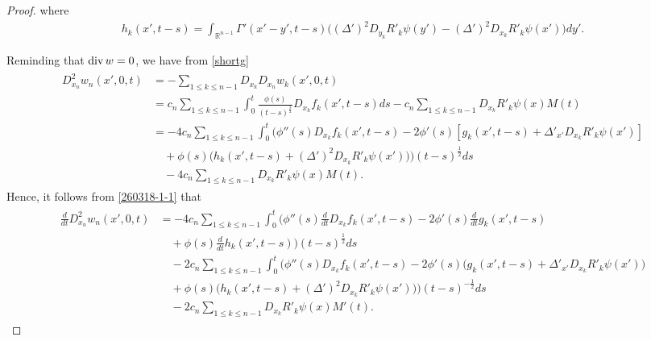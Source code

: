 \documentclass{amsart}
\numberwithin{equation}{section}
\newcommand{\Rn}{{\mathbb R}^{n-1}}
\newcommand{\De}{\Delta}
\newcommand{\Ga}{\Gamma}
\begin{document}
\begin{proof}
where 
\begin{align*}
h_k (x', t-s)  = \int_{\Rn} \Ga' (x'- y', t-s) \Big(  ( \De')^2  D_{y_k} R'_k \psi(y') -  ( \De')^2  D_{x_k}  R'_k \psi(x') \Big) dy'.
\end{align*}





 


 
Reminding that $ {\rm div} \, w =0$, we have  from \eqref{shortg}
\begin{align}\label{260318-1-1}
\begin{split}
D_{x_n}^2 w_n(x',  0, t) & =  -\sum_{1 \leq k \leq n-1} D_{x_k} D_{x_n} w_k (x', 0, t)\\
 & =   c_n \sum_{1 \leq k \leq n-1}\int_0^t  \frac{ \phi(s)}{(t-s)^\frac32}    D_{x_k}  f_k (x', t-s) ds    -c_n  \sum_{1 \leq k \leq n-1} D_{x_k}  R'_k \psi(x) M(t)\\
 & = -4  c_n  \sum_{1 \leq k \leq n-1} \int_0^t    \Big(  \phi'' (s)    D_{x_k}  f _k(x', t-s)  -  2\phi'  (s)   [g_k (x', t-s) +   \De'_{x'} D_{x_k} R'_k \psi(x') ] \\
& \quad    + \phi (s) \big(h_k (x', t-s)   + ( \De')^2 D_{x_k}  R'_k \psi(x')   \big) \Big)  (t-s)^{\frac12}   ds\\
 &  \quad    -4c_n  \sum_{1 \leq k \leq n-1} D_{x_k}  R'_k \psi(x) M(t).
 \end{split}
\end{align}
Hence,  it follows from \eqref{260318-1-1} that
\begin{align}\label{260318-1}
\begin{split}
\frac{d}{dt} D_{x_n}^2 w_n(x',  0, t) 
 & =  -4  c_n  \sum_{1 \leq k \leq n-1} \int_0^t    \Big(  \phi'' (s)     \frac{d}{dt}  D_{x_k}  f _k(x', t-s)  -  2\phi'  (s)   \frac{d}{dt}  g_k (x', t-s)  \\
& \quad    + \phi (s)  \frac{d}{dt}  h_k (x', t-s)   \Big)  (t-s)^{\frac12}   ds\\
&\quad   -2    c_n  \sum_{1 \leq k \leq n-1} \int_0^t    \Big(  \phi'' (s)    D_{x_k}  f _k(x', t-s)  -  2\phi'  (s)   \Big(g_k (x', t-s) +   \De'_{x'} D_{x_k} R'_k \psi(x') \Big) \\
& \quad    + \phi (s) \big(h_k (x', t-s)   + ( \De')^2 D_{x_k}  R'_k \psi(x')   \big) \Big)  (t-s)^{-\frac12}   ds\\
 &  \quad    -2c_n  \sum_{1 \leq k \leq n-1} D_{x_k}  R'_k \psi(x)M'(t).
 \end{split}
\end{align}
 

\end{proof}
\end{document}
